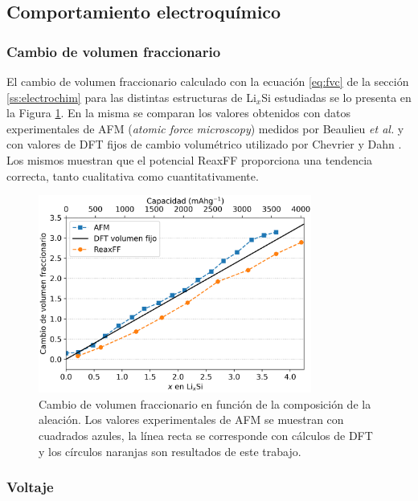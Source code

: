 \subsection{Comportamiento electroquímico}

\subsubsection{Cambio de volumen fraccionario}

El cambio de volumen fraccionario calculado con la ecuación \ref{eq:fvc} de la 
sección \ref{ss:electrochim} para las distintas estructuras de Li$_x$Si estudiadas 
se lo presenta en la Figura \ref{fig:fvc}. En la misma se comparan los valores 
obtenidos con datos experimentales de AFM (\textit{atomic force microscopy}) 
medidos por Beaulieu \textit{et al.} \cite{beaulieu2003} y con valores de DFT 
fijos de cambio volumétrico utilizado por Chevrier y Dahn \cite{chevrier2009}. 
Los mismos muestran que el potencial ReaxFF proporciona una tendencia correcta, 
tanto cualitativa como cuantitativamente.
\begin{figure}[h!]
    \centering
    \includegraphics[width=0.8\textwidth]{Silicio/caracterizacion/resultados/electroquimica/fvc.png}
    \caption{Cambio de volumen fraccionario en función de la composición de la 
    aleación. Los valores experimentales de AFM se muestran con cuadrados azules, 
    la línea recta se corresponde con cálculos de DFT y los círculos naranjas son 
    resultados de este trabajo.}
    \label{fig:fvc}
\end{figure}

\subsubsection{Voltaje}

